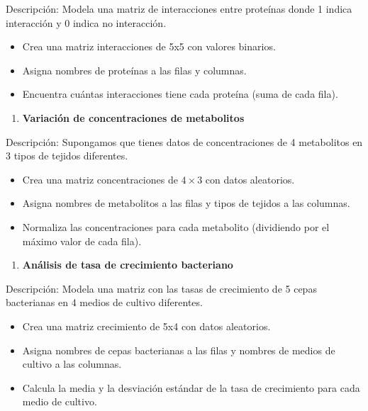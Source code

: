 \documentclass[
]{book}
\providecommand{\tightlist}{%
  \setlength{\itemsep}{0pt}\setlength{\parskip}{0pt}}
\begin{document}
Descripción: Modela una matriz de interacciones entre proteínas donde 1 indica interacción y 0 indica no interacción.

\begin{itemize}
\tightlist
\item
  Crea una matriz interacciones de 5x5 con valores binarios.
\item
  Asigna nombres de proteínas a las filas y columnas.
\item
  Encuentra cuántas interacciones tiene cada proteína (suma de cada fila).
\end{itemize}

\begin{enumerate}
\def\labelenumi{\arabic{enumi}.}
\setcounter{enumi}{12}
\tightlist
\item
  \textbf{Variación de concentraciones de metabolitos}
\end{enumerate}

Descripción: Supongamos que tienes datos de concentraciones de 4 metabolitos en 3 tipos de tejidos diferentes.

\begin{itemize}
\tightlist
\item
  Crea una matriz concentraciones de \(4 \times 3\) con datos aleatorios.
\item
  Asigna nombres de metabolitos a las filas y tipos de tejidos a las columnas.
\item
  Normaliza las concentraciones para cada metabolito (dividiendo por el máximo valor de cada fila).
\end{itemize}

\begin{enumerate}
\def\labelenumi{\arabic{enumi}.}
\setcounter{enumi}{13}
\tightlist
\item
  \textbf{Análisis de tasa de crecimiento bacteriano}
\end{enumerate}

Descripción: Modela una matriz con las tasas de crecimiento de 5 cepas bacterianas en 4 medios de cultivo diferentes.

\begin{itemize}
\tightlist
\item
  Crea una matriz crecimiento de 5x4 con datos aleatorios.
\item
  Asigna nombres de cepas bacterianas a las filas y nombres de medios de cultivo a las columnas.
\item
  Calcula la media y la desviación estándar de la tasa de crecimiento para cada medio de cultivo.
\end{itemize}
\end{document}
